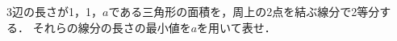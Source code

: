 \documentclass[../../main.tex]{subfiles}
\begin{document}
3辺の長さが1，1，$a$である三角形の面積を，周上の2点を結ぶ線分で2等分する．
それらの線分の長さの最小値を$a$を用いて表せ．
\end{document}
